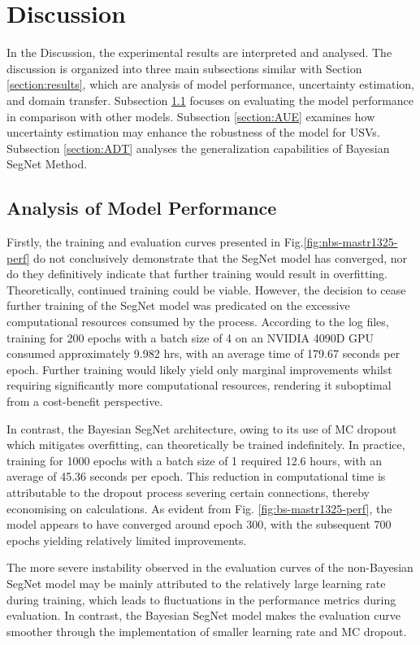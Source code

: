 \section{Discussion}
\label{section:discussion}
In the Discussion, the experimental results are interpreted and analysed. The discussion is organized into three 
main subsections similar with Section \ref{section:results}, which are analysis of model performance, uncertainty 
estimation, and domain transfer. Subsection \ref{section:AMP} focuses on evaluating the model performance in 
comparison with other models. Subsection \ref{section:AUE} examines how uncertainty estimation may enhance the 
robustness of the model for USVs. Subsection \ref{section:ADT} analyses the generalization capabilities of 
Bayesian SegNet Method.

\subsection{Analysis of Model Performance}
\label{section:AMP}
Firstly, the training and evaluation curves presented in Fig.\ref{fig:nbs-mastr1325-perf} do not conclusively 
demonstrate that the SegNet model has converged, nor do they definitively indicate that further training would 
result in overfitting. Theoretically, continued training could be viable. However, the decision to cease further 
training of the SegNet model was predicated on the excessive computational resources consumed by the process. 
According to the log files, training for 200 epochs with a batch size of 4 on an NVIDIA 4090D GPU consumed 
approximately 9.982 hrs, with an average time of 179.67 seconds per epoch. Further training would likely yield 
only marginal improvements whilst requiring significantly more computational resources, rendering it suboptimal 
from a cost-benefit perspective. 

In contrast, the Bayesian SegNet architecture, owing to its use of MC dropout which mitigates overfitting, can 
theoretically be trained indefinitely. In practice, training for 1000 epochs with a batch size of 1 required 12.6 
hours, with an average of 45.36 seconds per epoch. This reduction in computational time is attributable to the 
dropout process severing certain connections, thereby economising on calculations. As evident from Fig.
\ref{fig:bs-mastr1325-perf}, the model appears to have converged around epoch 300, with the subsequent 700 epochs 
yielding relatively limited improvements.

The more severe instability observed in the evaluation curves of the non-Bayesian SegNet model may be mainly 
attributed to the relatively large learning rate during training, which leads to fluctuations in the performance 
metrics during evaluation. In contrast, the Bayesian SegNet model makes the evaluation curve smoother through the 
implementation of smaller learning rate and MC dropout.


